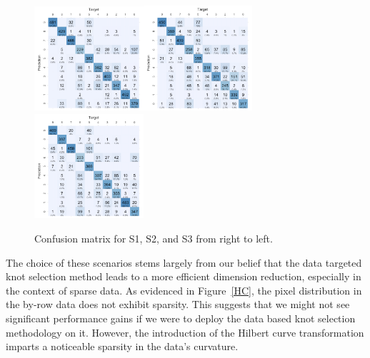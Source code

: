 \begin{figure}[t!]
  \centering
\hspace*{-.8cm}\includegraphics[width=0.36\textwidth]{figures/Fig10LeftConfMat.png}\includegraphics[width=0.36\textwidth]{figures/Fig10MiddleConfMat.png}\includegraphics[width=0.36\textwidth]{figures/Fig10RightConfMat.png}
  \caption{Confusion matrix for S1, S2, and S3 from right to left.}\vspace{-.22cm}
  \label{CM}
  \end{figure}

The choice of these scenarios stems largely from our belief that the data targeted knot selection method leads to a more efficient dimension reduction, especially in the context of sparse data. As evidenced in Figure~\ref{HC}, the pixel distribution in the by-row data does not exhibit sparsity. This suggests that we might not see significant performance gains if we were to deploy the data based knot selection methodology on it.
However, the introduction of the Hilbert curve transformation imparts a noticeable sparsity in the data's curvature. 


